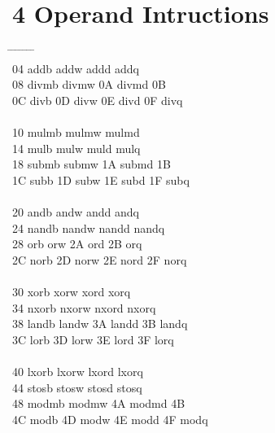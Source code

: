 \documentclass[letterpaper,10pt,openright,twoside,onecolumn]{book}
\begin{document}
\section{4 Operand Intructions}
  \begin{tabbing}
    \makebox[\ncol]{00\hfill} \= 	\=
    \makebox[\ncol]{01\hfill} \= 	\=
    \makebox[\ncol]{02\hfill} \= 	\=
    \makebox[\ncol]{03\hfill} \= \\
    04 \> addb	 \> addw	 \> addd	 \> addq	\\
    08 \> divmb	 \> divmw	\> 0A \> divmd	\> 0B \> 	\\
    0C \> divb	\> 0D \> divw	\> 0E \> divd	\> 0F \> divq	\\
    \\
    10 \> mulmb	 \> mulmw	 \> mulmd	 \> 	\\
    14 \> mulb	 \> mulw	 \> muld	 \> mulq	\\
    18 \> submb	 \> submw	\> 1A \> submd	\> 1B \> 	\\
    1C \> subb	\> 1D \> subw	\> 1E \> subd	\> 1F \> subq	\\
    \\
    20 \> andb	 \> andw	 \> andd	 \> andq	\\
    24 \> nandb	 \> nandw	 \> nandd	 \> nandq	\\
    28 \> orb	 \> orw	\> 2A \> ord	\> 2B \> orq	\\
    2C \> norb	\> 2D \> norw	\> 2E \> nord	\> 2F \> norq	\\
    \\
    30 \> xorb	 \> xorw	 \> xord	 \> xorq	\\
    34 \> nxorb	 \> nxorw	 \> nxord	 \> nxorq	\\
    38 \> landb	 \> landw	\> 3A \> landd	\> 3B \> landq	\\
    3C \> lorb	\> 3D \> lorw	\> 3E \> lord	\> 3F \> lorq	\\
    \\
    40 \> lxorb	 \> lxorw	 \> lxord	 \> lxorq	\\
    44 \> stosb	 \> stosw	 \> stosd	 \> stosq	\\
    48 \> modmb	 \> modmw	\> 4A \> modmd	\> 4B \> 	\\
    4C \> modb	\> 4D \> modw	\> 4E \> modd	\> 4F \> modq	\\

\end{tabbing}
\end{document}
